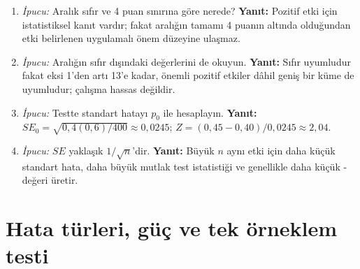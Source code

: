 \begin{enumerate}[leftmargin=*,itemsep=5pt]
Kanıt değişmez, yalnız karar eşiği değişir.
\item \emph{İpucu:} Aralık sıfır ve 4 puan sınırına göre nerede?
\textbf{Yanıt:} Pozitif etki için istatistiksel kanıt vardır; fakat aralığın
tamamı 4 puanın altında olduğundan etki belirlenen uygulamalı önem düzeyine ulaşmaz.
\item \emph{İpucu:} Aralığın sıfır dışındaki değerlerini de okuyun.
\textbf{Yanıt:} Sıfır uyumludur fakat eksi 1'den artı 13'e kadar, önemli
pozitif etkiler dâhil geniş bir küme de uyumludur; çalışma hassas değildir.
\item \emph{İpucu:} Testte standart hatayı $p_0$ ile hesaplayın.
\textbf{Yanıt:} $SE_0=\sqrt{0{,}4(0{,}6)/400}\approx0{,}0245$;
$Z=(0{,}45-0{,}40)/0{,}0245\approx2{,}04$.
\item \emph{İpucu:} $SE$ yaklaşık $1/\sqrt n$'dir.
\textbf{Yanıt:} Büyük $n$ aynı etki için daha küçük standart hata, daha büyük
mutlak test istatistiği ve genellikle daha küçük \pval-değeri üretir.
\end{enumerate}

\section{Hata türleri, güç ve tek örneklem testi}

